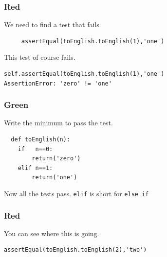 \documentclass{beamer}
\begin{document}
\begin{frame}[fragile]
\frametitle{Red}
We need to find a test that fails.
\color{red}
\begin{lstlisting}
     assertEqual(toEnglish.toEnglish(1),'one')
   \end{lstlisting}
\color{black}
This test of course fails.
\begin{verbatim}
self.assertEqual(toEnglish.toEnglish(1),'one')
AssertionError: 'zero' != 'one'
\end{verbatim}
\end{frame}
\begin{frame}[fragile]
  \frametitle{Green}
Write the minimum to pass the test.
\begin{lstlisting}
  def toEnglish(n):
    if   n==0:
        return('zero')
    elif n==1:
        return('one')
\end{lstlisting}
Now all the tests pass. {\tt elif} is short for {\tt else if}
\end{frame}

\begin{frame}[fragile]
\frametitle{Red}
You can see where this is going.
\color{red}
  \begin{lstlisting}
assertEqual(toEnglish.toEnglish(2),'two')
\end{lstlisting}
\color{black}
\end{frame}
\end{document}
